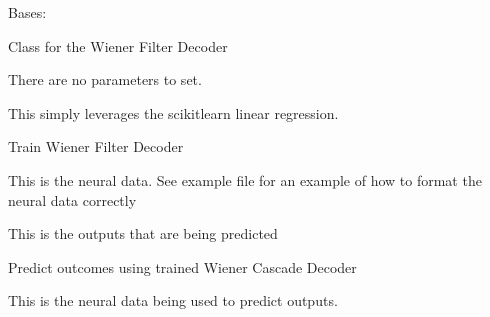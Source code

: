 \documentclass[letterpaper,10pt,english]{sphinxmanual}
\begin{document}
\begin{fulllineitems}
\label{\detokenize{LinearRegression:LinearRegression.WienerFilterDecoder}}
\pysigstartsignatures
{}
\pysigstopsignatures
\sphinxAtStartPar
Bases: 

\sphinxAtStartPar
Class for the Wiener Filter Decoder

\sphinxAtStartPar
There are no parameters to set.

\sphinxAtStartPar
This simply leverages the scikit\sphinxhyphen{}learn linear regression.

\begin{fulllineitems}
\label{\detokenize{LinearRegression:LinearRegression.WienerFilterDecoder.fit}}
\pysigstartsignatures
{}
\pysigstopsignatures
\sphinxAtStartPar
Train Wiener Filter Decoder
\begin{description}
\sphinxAtStartPar
This is the neural data.
See example file for an example of how to format the neural data correctly

\sphinxAtStartPar
This is the outputs that are being predicted

\end{description}

\end{fulllineitems}


\begin{fulllineitems}
\label{\detokenize{LinearRegression:LinearRegression.WienerFilterDecoder.predict}}
\pysigstartsignatures
{}
\pysigstopsignatures
\sphinxAtStartPar
Predict outcomes using trained Wiener Cascade Decoder
\begin{description}
\sphinxAtStartPar
This is the neural data being used to predict outputs.


\end{description}
\end{fulllineitems}
\end{fulllineitems}
\end{document}
